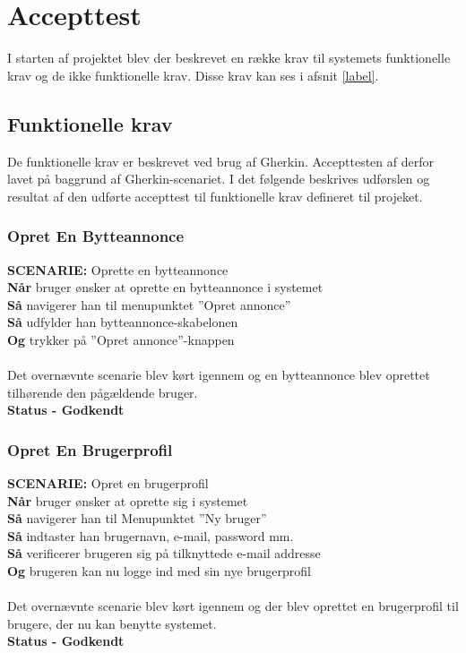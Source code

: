 \chapter{Accepttest}
I starten af projektet blev der beskrevet en række krav til systemets funktionelle krav og de ikke funktionelle krav. Disse krav kan ses i afsnit \ref{label}.

\section{Funktionelle krav}
De funktionelle krav er beskrevet ved brug af Gherkin. Accepttesten af derfor lavet på baggrund af Gherkin-scenariet. I det følgende beskrives udførslen og resultat af den udførte accepttest til funktionelle krav defineret til projeket.

\subsection{Opret En Bytteannonce}
{\color{blue}\textbf{SCENARIE:}} Oprette en bytteannonce \\ 
{\color{blue}\textbf{Når}}  bruger ønsker at oprette en bytteannonce i systemet \\
{\color{blue}\textbf{Så}} navigerer han til menupunktet ”Opret annonce” \\
{\color{blue}\textbf{Så}} udfylder han bytteannonce-skabelonen \\
{\color{blue}\textbf{Og}} trykker på ”Opret annonce”-knappen \\ \\
Det overnævnte scenarie blev kørt igennem og en bytteannonce blev oprettet tilhørende den pågældende bruger. \\
\textbf{Status - Godkendt}

\subsection{Opret En Brugerprofil}
{\color{blue}\textbf{SCENARIE:}} Opret en brugerprofil \\
{\color{blue}\textbf{Når}} bruger ønsker at oprette sig i systemet \\
{\color{blue}\textbf{Så}} navigerer han til Menupunktet ”Ny bruger” \\
{\color{blue}\textbf{Så}} indtaster han brugernavn, e-mail, password mm.\\
{\color{blue}\textbf{Så}} verificerer brugeren sig på tilknyttede e-mail addresse\\
{\color{blue}\textbf{Og}} brugeren kan nu logge ind med sin nye brugerprofil \\ \\
Det overnævnte scenarie blev kørt igennem og der blev oprettet en brugerprofil til brugere, der nu kan benytte systemet.  \\
\textbf{Status - Godkendt}

